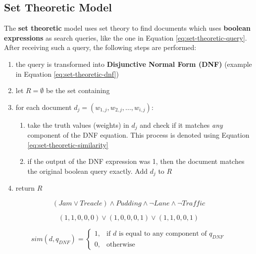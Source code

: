 \documentclass{article}
\begin{document}
\subsection{Set Theoretic Model}

The \textbf{set theoretic} model uses set theory to find documents which uses \textbf{boolean expressions} as search queries, like the one in Equation \ref{eq:set-theoretic-query}. After receiving such a query, the following steps are performed:
\begin{enumerate}
	\item the query is transformed into \textbf{Disjunctive Normal Form (DNF)} (example in Equation \ref{eq:set-theoretic-dnf})
	\item let $R = \emptyset$ be the set containing
	\item for each document $d_j = (w_{1,j}, w_{2,j}, ..., w_{i,j})$:
	\begin{enumerate}
		\item take the truth values (weights) in $d_j$ and check if it matches \textit{any} component of the DNF equation. This process is denoted using Equation \ref{eq:set-theoretic-similarity}
		\item if the output of the DNF expression was 1, then the document matches the original boolean query exactly. Add $d_j$ to $R$
	\end{enumerate}
	\item return $R$
\end{enumerate}

\begin{equation}
	(Jam \lor Treacle) \land Pudding \land \neg{Lane} \land \neg{Traffic}
	\label{eq:set-theoretic-query}
\end{equation}

\begin{equation}
	(1, 1, 0, 0, 0) \lor (1, 0, 0, 0, 1) \lor (1, 1, 0, 0, 1)
	\label{eq:set-theoretic-dnf}
\end{equation}

\begin{equation}
	sim(d, q_{DNF}) = \begin{cases}
		1,& \text{if }d\text{ is equal to any component of }q_{DNF} \\
		0,& \text{otherwise}
	\end{cases}
	\label{eq:set-theoretic-similarity}
\end{equation}
\end{document}
